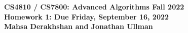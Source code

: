 \documentclass[11pt]{article}
\theoremstyle{definition}
\newcommand{\HWtitle}[2]{\begin{figure}[t!]{\bfseries \Large \color{DarkBlue}  \noindent CS4810 / CS7800: Advanced Algorithms \hfill Fall 2022} \\[0.2em] {\bfseries \Large \color{DarkBlue} Homework #1: Due {#2}} \\[1em] {\bfseries \large Mahsa Derakhshan and Jonathan Ullman}\\[1ex] \end{figure}}
\begin{document}

\HWtitle{1}{Friday, September 16, 2022}


%

\renewcommand{\labelenumii}{{\bfseries \em \arabic{enumi}.\arabic{enumii}}}
\newcommand{\problemitem}{\renewcommand{\labelenumi}{{\bfseries \em Problem \arabic{enumi}}}\item}
\newcommand{\solutionitem}{\renewcommand{\labelenumi}{{\bfseries \em Solution \arabic{enumi}}}\addtocounter{enumi}{-1}\item}
\end{document}
